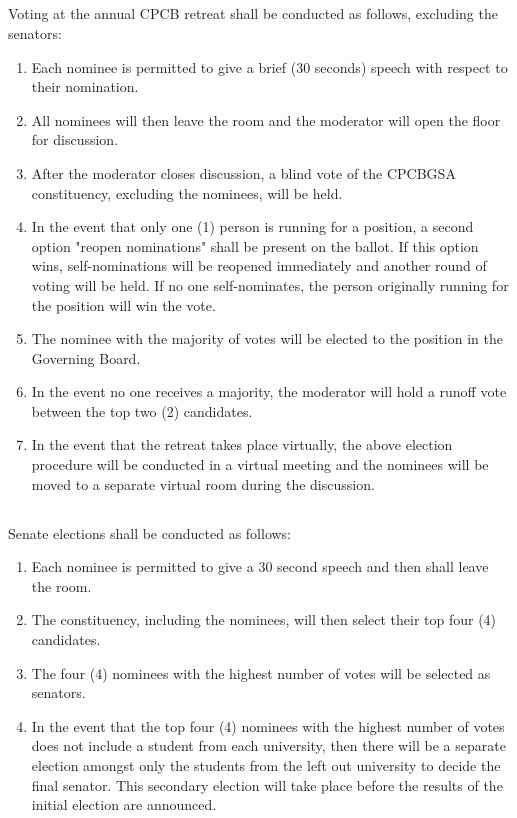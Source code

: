 \documentclass[11pt,a4paper]{article}
\begin{document}
\subsection{} Voting at the annual CPCB retreat shall be conducted as follows, excluding the senators:
\begin{enumerate}        
	\item Each nominee is permitted to give a brief (30 seconds) speech with respect to their nomination.
	\item All nominees will then leave the room and the moderator will open the floor for discussion.
	\item After the moderator closes discussion, a blind vote of the CPCBGSA constituency, excluding the nominees, will be held.
	\item In the event that only one (1) person is running for a position, a second option "reopen nominations" shall be present on the ballot. If this option wins, self-nominations will be reopened immediately and another round of voting will be held. If no one self-nominates, the person originally running for the position will win the vote.
	\item The nominee with the majority of votes will be elected to the position in the Governing Board.
	\item In the event no one receives a majority, the moderator will hold a runoff vote between the top two (2) candidates.
	\item In the event that the retreat takes place virtually, the above election procedure will be conducted in a virtual meeting and the nominees will be moved to a separate virtual room during the discussion. 
\end{enumerate}        
 
\subsection{} Senate elections shall be conducted as follows:
\begin{enumerate}        
    \item Each nominee is permitted to give a 30 second speech and then shall leave the room.
    \item The constituency, including the nominees, will then select their top four (4) candidates.
    \item The four (4) nominees with the highest number of votes will be selected as senators. 
    \item In the event that the top four (4) nominees with the highest number of votes does not include a student from each university, then there will be a separate election amongst only the students from the left out university to decide the final senator. This secondary election will take place before the results of the initial election are announced. 
\end{enumerate}        
\end{document}
